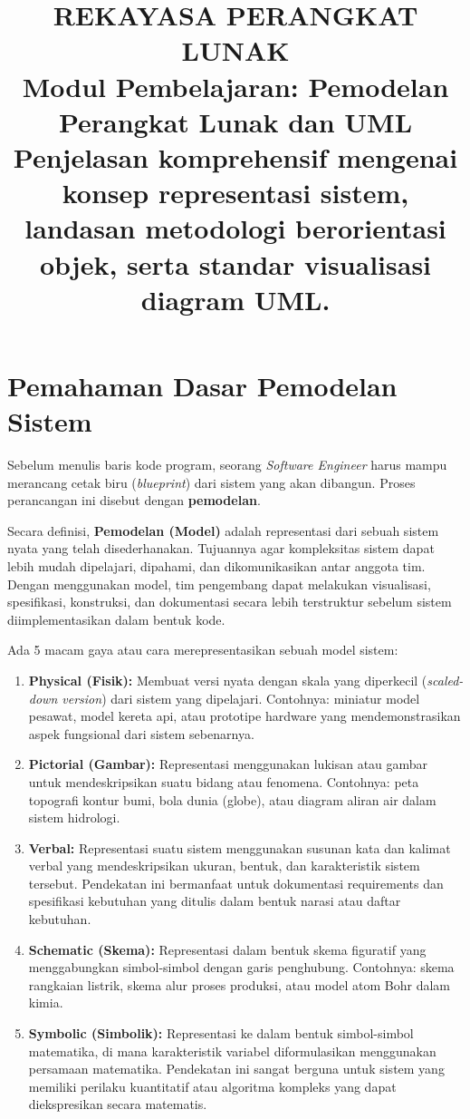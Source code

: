 \documentclass[12pt,a4paper]{article}
\title{
  {\LARGE\bfseries REKAYASA PERANGKAT LUNAK}\\[0.5em]
  {\large Modul Pembelajaran: Pemodelan Perangkat Lunak dan UML}\\[0.8em]
  {\normalsize Penjelasan komprehensif mengenai konsep representasi sistem, landasan metodologi berorientasi objek, serta standar visualisasi diagram UML.}
}
\author{}
\date{}
\begin{document}
\maketitle
\thispagestyle{fancy}
\tableofcontents
\newpage


\section{Pemahaman Dasar Pemodelan Sistem}

Sebelum menulis baris kode program, seorang \textit{Software Engineer} harus mampu merancang cetak biru (\textit{blueprint}) dari sistem yang akan dibangun. Proses perancangan ini disebut dengan \textbf{pemodelan}.

Secara definisi, \textbf{Pemodelan (Model)} adalah representasi dari sebuah sistem nyata yang telah disederhanakan. Tujuannya agar kompleksitas sistem dapat lebih mudah dipelajari, dipahami, dan dikomunikasikan antar anggota tim. Dengan menggunakan model, tim pengembang dapat melakukan visualisasi, spesifikasi, konstruksi, dan dokumentasi secara lebih terstruktur sebelum sistem diimplementasikan dalam bentuk kode.

Ada 5 macam gaya atau cara merepresentasikan sebuah model sistem:

\begin{enumerate}
    \item \textbf{Physical (Fisik):} Membuat versi nyata dengan skala yang diperkecil (\textit{scaled-down version}) dari sistem yang dipelajari. Contohnya: miniatur model pesawat, model kereta api, atau prototipe hardware yang mendemonstrasikan aspek fungsional dari sistem sebenarnya.
    
    \item \textbf{Pictorial (Gambar):} Representasi menggunakan lukisan atau gambar untuk mendeskripsikan suatu bidang atau fenomena. Contohnya: peta topografi kontur bumi, bola dunia (globe), atau diagram aliran air dalam sistem hidrologi.
    
    \item \textbf{Verbal:} Representasi suatu sistem menggunakan susunan kata dan kalimat verbal yang mendeskripsikan ukuran, bentuk, dan karakteristik sistem tersebut. Pendekatan ini bermanfaat untuk dokumentasi requirements dan spesifikasi kebutuhan yang ditulis dalam bentuk narasi atau daftar kebutuhan.
    
    \item \textbf{Schematic (Skema):} Representasi dalam bentuk skema figuratif yang menggabungkan simbol-simbol dengan garis penghubung. Contohnya: skema rangkaian listrik, skema alur proses produksi, atau model atom Bohr dalam kimia.
    
    \item \textbf{Symbolic (Simbolik):} Representasi ke dalam bentuk simbol-simbol matematika, di mana karakteristik variabel diformulasikan menggunakan persamaan matematika. Pendekatan ini sangat berguna untuk sistem yang memiliki perilaku kuantitatif atau algoritma kompleks yang dapat diekspresikan secara matematis.
\end{enumerate}
\end{document}
